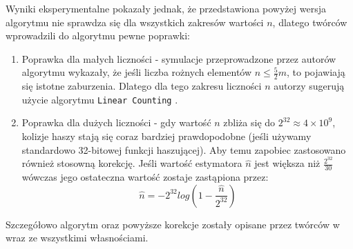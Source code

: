 Wyniki eksperymentalne pokazały jednak, że przedstawiona powyżej wersja algorytmu nie sprawdza się dla wszystkich zakresów wartości $n$, dlatego twórców wprowadzili do algorytmu pewne poprawki:
\begin{enumerate}
    \item Poprawka dla małych liczności - symulacje przeprowadzone przez autorów algorytmu wykazały, że jeśli liczba rożnych elementów $n \le \frac{5}{2}m$, 
    to pojawiają się istotne zaburzenia. Dlatego dla tego zakresu liczności $n$ autorzy sugerują użycie  algorytmu \texttt{Linear Counting} \cite{linear}.
    
    \item Poprawka dla dużych liczności - gdy wartość $n$ zbliża się do $2^{32} \approx 4 \times 10^9$, kolizje haszy stają się coraz bardziej prawdopodobne (jeśli używamy standardowo 32-bitowej funkcji haszującej). Aby temu zapobiec zastosowano również stosowną korekcję. Jeśli wartość estymatora $\hat{n}$ jest większa niż $\frac{2^{32}}{30}$ wówczas jego ostateczna wartość zostaje zastąpiona przez:
    \begin{equation}
	    \hat{n} = {-2}^{32}log(1 - \frac{\hat{n}}{2^{32}})
    \end{equation}
\end{enumerate}
Szczegółowo algorytm oraz powyższe korekcje zostały opisane przez twórców w \cite{hll} wraz ze wszystkimi własnościami.

